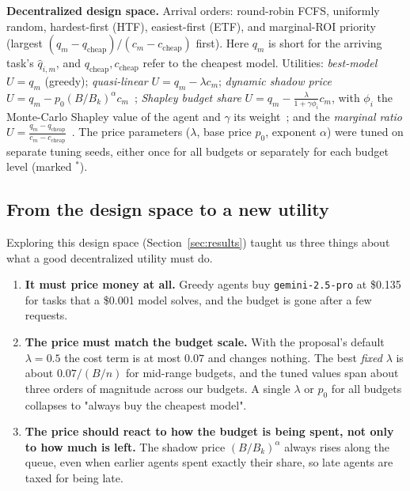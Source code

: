 \documentclass{article}
\begin{document}
\textbf{Decentralized design space.} Arrival orders: round-robin FCFS, uniformly random, hardest-first (HTF), easiest-first (ETF), and marginal-ROI priority (largest $(q_m - q_{\text{cheap}})/(c_m - c_{\text{cheap}})$ first). Here $q_m$ is short for the arriving task's $\hat q_{i,m}$, and $q_{\text{cheap}}, c_{\text{cheap}}$ refer to the cheapest model. Utilities: \emph{best-model} $U=q_m$ (greedy); \emph{quasi-linear} $U = q_m - \lambda c_m$; \emph{dynamic shadow price} $U = q_m - p_0 (B/B_k)^{\alpha} c_m$~\cite{kelly1998rate,balseiro2019learning}; \emph{Shapley budget share} $U = q_m - \frac{\lambda}{1+\gamma\phi_i} c_m$, with $\phi_i$ the Monte-Carlo Shapley value of the agent and $\gamma$ its weight~\cite{chandan2019optimal}; and the \emph{marginal ratio} $U = \frac{q_m - q_{\text{cheap}}}{c_m - c_{\text{cheap}}}$~\cite{williams2017decentralised}. The price parameters ($\lambda$, base price $p_0$, exponent $\alpha$) were tuned on separate tuning seeds, either once for all budgets or separately for each budget level (marked $^*$).

\subsection{From the design space to a new utility}
\label{sec:fssp}

Exploring this design space (Section~\ref{sec:results}) taught us three things about what a good decentralized utility must do.
\begin{enumerate}[leftmargin=*, itemsep=1pt]
  \item \textbf{It must price money at all.} Greedy agents buy \texttt{gemini-2.5-pro} at \$0.135 for tasks that a \$0.001 model solves, and the budget is gone after a few requests.
  \item \textbf{The price must match the budget scale.} With the proposal's default $\lambda=0.5$ the cost term is at most $0.07$ and changes nothing. The best \emph{fixed} $\lambda$ is about $0.07/(B/n)$ for mid-range budgets, and the tuned values span about three orders of magnitude across our budgets. A single $\lambda$ or $p_0$ for all budgets collapses to "always buy the cheapest model".
  \item \textbf{The price should react to how the budget is being spent, not only to how much is left.} The shadow price $(B/B_k)^{\alpha}$ always rises along the queue, even when earlier agents spent exactly their share, so late agents are taxed for being late.
\end{enumerate}
\end{document}
